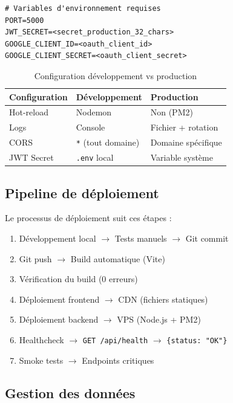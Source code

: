 \begin{verbatim}
# Variables d'environnement requises
PORT=5000
JWT_SECRET=<secret_production_32_chars>
GOOGLE_CLIENT_ID=<oauth_client_id>
GOOGLE_CLIENT_SECRET=<oauth_client_secret>
\end{verbatim}

\begin{table}[H]
\centering
\caption{Configuration développement vs production}
\label{tab:config-envs}
\begin{tabular}{|l|l|l|}
\hline
\textbf{Configuration} & \textbf{Développement} & \textbf{Production} \\
\hline
Hot-reload & Nodemon & Non (PM2) \\
\hline
Logs & Console & Fichier + rotation \\
\hline
CORS & \texttt{*} (tout domaine) & Domaine spécifique \\
\hline
JWT Secret & \texttt{.env} local & Variable système \\
\hline
\end{tabular}
\end{table}

\subsection{Pipeline de déploiement}

Le processus de déploiement suit ces étapes :

\begin{enumerate}
    \item Développement local $\rightarrow$ Tests manuels $\rightarrow$ Git commit
    \item Git push $\rightarrow$ Build automatique (Vite)
    \item Vérification du build (0 erreurs)
    \item Déploiement frontend $\rightarrow$ CDN (fichiers statiques)
    \item Déploiement backend $\rightarrow$ VPS (Node.js + PM2)
    \item Healthcheck $\rightarrow$ \texttt{GET /api/health} $\rightarrow$ \texttt{\{status: "OK"\}}
    \item Smoke tests $\rightarrow$ Endpoints critiques
\end{enumerate}

\subsection{Gestion des données}

